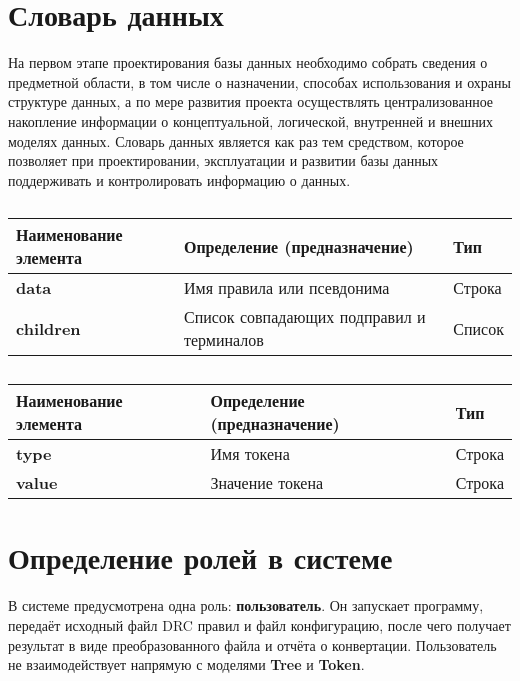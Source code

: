 \section{Словарь данных}

На первом этапе проектирования базы данных необходимо собрать сведения о
предметной области, в том числе о назначении, способах использования и охраны
структуре данных, а по мере развития проекта осуществлять централизованное
накопление информации о концептуальной, логической, внутренней и внешних
моделях данных. Словарь данных является как раз тем средством, которое
позволяет при проектировании, эксплуатации и развитии базы данных
поддерживать и контролировать информацию о данных.

\begin{longtable}{|p{3.5cm}|p{5cm}|p{5cm}|}
	\caption{} \\
	\hline
	\textbf{Наименование элемента}
	& \textbf{Определение (предназначение)}
	& \textbf{Тип} \\
	\hline
	\endhead
	\textbf{data} & Имя правила или псевдонима & Строка \\ \hline
	\textbf{children}
	& Список совпадающих подправил и терминалов
	& Список \\ \hline
\end{longtable}

\begin{longtable}{|p{3.5cm}|p{5cm}|p{5cm}|}
	\caption{} \\
	\hline
	\textbf{Наименование элемента}
	& \textbf{Определение (предназначение)}
	& \textbf{Тип} \\
	\hline
	\endhead
	\textbf{type} & Имя токена & Строка \\ \hline
	\textbf{value} & Значение токена & Строка \\ \hline
\end{longtable}

\clearpage

\section{Определение ролей в системе}

В системе предусмотрена одна роль: \textbf{пользователь}.
Он запускает программу, передаёт исходный файл DRC правил и файл конфигурацию,
после чего получает результат в виде преобразованного файла
и отчёта о конвертации.
Пользователь не взаимодействует напрямую
с моделями \textbf{Tree} и \textbf{Token}.

